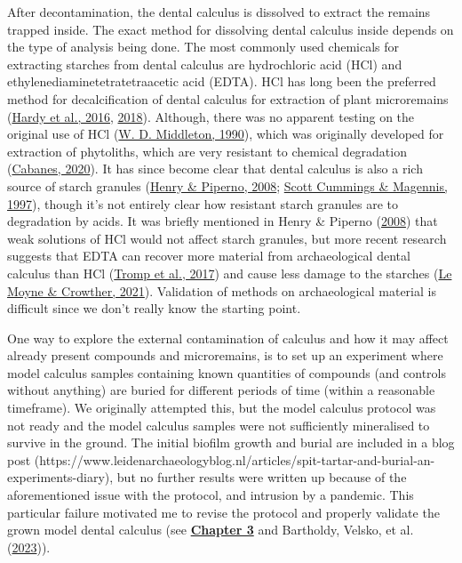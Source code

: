 \documentclass[
  letterpaper,
]{book}
\begin{document}
After decontamination, the dental calculus is dissolved to extract the
remains trapped inside. The exact method for dissolving dental calculus
inside depends on the type of analysis being done. The most commonly
used chemicals for extracting starches from dental calculus are
hydrochloric acid (HCl) and ethylenediaminetetratetraacetic acid (EDTA).
HCl has long been the preferred method for decalcification of dental
calculus for extraction of plant microremains
(\protect\hyperlink{ref-hardyDentalCalculus2016}{Hardy et al., 2016},
\protect\hyperlink{ref-hardyRecoveringInformation2018}{2018}). Although,
there was no apparent testing on the original use of HCl
(\protect\hyperlink{ref-middletonImprovedMethod1990}{W. D. Middleton,
1990}), which was originally developed for extraction of phytoliths,
which are very resistant to chemical degradation
(\protect\hyperlink{ref-cabanesPhytolithAnalysis2020}{Cabanes, 2020}).
It has since become clear that dental calculus is also a rich source of
starch granules (\protect\hyperlink{ref-henryCalculusSyria2008}{Henry \&
Piperno, 2008}; \protect\hyperlink{ref-cummingsMayanCalculus1997}{Scott
Cummings \& Magennis, 1997}), though it's not entirely clear how
resistant starch granules are to degradation by acids. It was briefly
mentioned in Henry \& Piperno
(\protect\hyperlink{ref-henryCalculusSyria2008}{2008}) that weak
solutions of HCl would not affect starch granules, but more recent
research suggests that EDTA can recover more material from
archaeological dental calculus than HCl
(\protect\hyperlink{ref-trompEDTACalculus2017}{Tromp et al., 2017}) and
cause less damage to the starches
(\protect\hyperlink{ref-lemoyneCalculusPretreatments2021}{Le Moyne \&
Crowther, 2021}). Validation of methods on archaeological material is
difficult since we don't really know the starting point.

One way to explore the external contamination of calculus and how it may
affect already present compounds and microremains, is to set up an
experiment where model calculus samples containing known quantities of
compounds (and controls without anything) are buried for different
periods of time (within a reasonable timeframe). We originally attempted
this, but the model calculus protocol was not ready and the model
calculus samples were not sufficiently mineralised to survive in the
ground. The initial biofilm growth and burial are included in a blog
post
(https://www.leidenarchaeologyblog.nl/articles/spit-tartar-and-burial-an-experiments-diary),
but no further results were written up because of the aforementioned
issue with the protocol, and intrusion by a pandemic. This particular
failure motivated me to revise the protocol and properly validate the
grown model dental calculus (see
\protect\hyperlink{byoc-valid}{\textbf{Chapter 3}} and Bartholdy,
Velsko, et al.
(\protect\hyperlink{ref-bartholdyAssessingValidity2023}{2023})).
\end{document}
